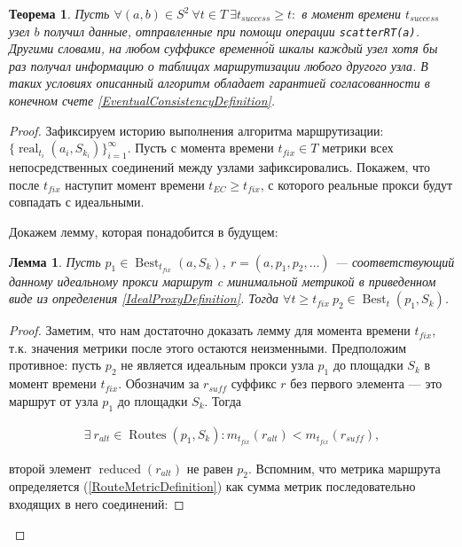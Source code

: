 \documentclass{article}
\theoremstyle{plain}
\newtheorem{theorem}{Теорема}[section]
\theoremstyle{plain}
\theoremstyle{plain}
\newtheorem{lemma}{Лемма}[section]
\theoremstyle{plain}
\theoremstyle{definition}
\theoremstyle{remark}
\theoremstyle{plain}
\DeclareMathOperator*{\real}{real}
\DeclareMathOperator*{\best}{Best}
\DeclareMathOperator*{\routes}{Routes}
\DeclareMathOperator*{\reduced}{reduced}
\begin{document}
\begin{theorem}
\label{RoutingEventualConsistencyTheorem}
    Пусть $\forall (a, b) \in S^2\ \forall t \in T\ \exists t_{success} \geq t \colon$ в момент времени $t_{success}$ узел $b$ получил данные, отправленные при помощи операции \texttt{scatterRT(a)}. Другими словами, на любом суффиксе временн\'{о}й шкалы каждый узел хотя бы раз получал информацию о таблицах маршрутизации любого другого узла. В таких условиях описанный алгоритм обладает гарантией согласованности в конечном счете \ref{EventualConsistencyDefinition}.
\end{theorem}
\begin{proof}
    Зафиксируем историю выполнения алгоритма маршрутизации: \\
    $\{\real_{t_i}(a_i, S_{k_i})\}_{i = 1}^{\infty}$. Пусть с момента времени $t_{fix} \in T$ метрики всех непосредственных соединений между узлами зафиксировались. Покажем, что после $t_{fix}$ наступит момент времени $t_{EC} \geq t_{fix}$, с которого реальные прокси будут совпадать с идеальными.
    
    Докажем лемму, которая понадобится в будущем:
    
    \begin{lemma}
    \label{IdealChain}
        Пусть $p_1 \in \best_{t_{fix}}(a, S_k)$, $r = (a, p_1, p_2, \ldots )$ --- соответствующий данному идеальному прокси маршрут c минимальной метрикой в приведенном виде из определения \ref{IdealProxyDefinition}. Тогда $\forall t \geq t_{fix}\ p_2 \in \best_t(p_1, S_k)$.
    \end{lemma}
    \begin{proof}
        Заметим, что нам достаточно доказать лемму для момента времени $t_{fix}$, т.к. значения метрики после этого остаются неизменными. Предположим противное: пусть $p_2$ не является идеальным прокси узла $p_1$ до площадки $S_k$ в момент времени $t_{fix}$. Обозначим за $r_{suff}$ суффикс $r$ без первого элемента --- это маршрут от узла $p_1$ до площадки $S_k$. Тогда
        
        \begin{equation*}
        \begin{aligned}
            \exists\ r_{alt} \in \routes(p_1, S_k) \colon m_{t_{fix}}(r_{alt}) < m_{t_{fix}}(r_{suff}),
        \end{aligned}
        \end{equation*}
        
         второй элемент $\reduced(r_{alt})$ не равен $p_2$. Вспомним, что метрика маршрута определяется (\ref{RouteMetricDefinition}) как сумма метрик последовательно входящих в него соединений:
        

\end{proof}
\end{proof}
\end{document}
